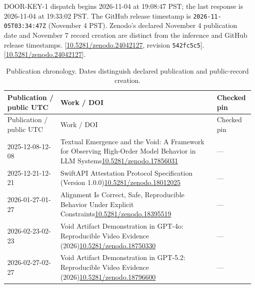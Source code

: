 \documentclass[11pt,letterpaper]{article}
\begin{document}
DOOR-KEY-1 dispatch begins 2026-11-04 at 19:08:47 PST; the last response is 2026-11-04 at 19:33:02 PST. The GitHub release timestamp is \texttt{2026-11-05T03:34:47Z} (November 4 PST). Zenodo’s declared November 4 publication date and November 7 record creation are distinct from the inference and GitHub release timestamps. [\href{https://doi.org/10.5281/zenodo.24042127}{10.5281/zenodo.24042127}, revision \texttt{542fc5c5}]. [\href{https://doi.org/10.5281/zenodo.24042127}{10.5281/zenodo.24042127}].

{\small
\begin{longtable}{p{1.25in}p{4.1in}l}
\caption{Publication chronology. Dates distinguish declared publication and public-record creation.}\label{tab:evidence-25}\\
\toprule
Publication / public UTC & Work / DOI & Checked pin \\ \midrule
\endfirsthead
\toprule
Publication / public UTC & Work / DOI & Checked pin \\ \midrule
\endhead
2025-12-08\newline 2025-12-08 & Textual Emergence and the Void: A Framework for Observing High-Order Model Behavior in LLM Systems\newline \href{https://doi.org/10.5281/zenodo.17856031}{10.5281/zenodo.17856031} & --- \\
2025-12-21\newline 2025-12-21 & SwiftAPI Attestation Protocol Specification (Version 1.0.0)\newline \href{https://doi.org/10.5281/zenodo.18012025}{10.5281/zenodo.18012025} & --- \\
2026-01-27\newline 2026-01-27 & Alignment Is Correct, Safe, Reproducible Behavior Under Explicit Constraints\newline \href{https://doi.org/10.5281/zenodo.18395519}{10.5281/zenodo.18395519} & --- \\
2026-02-23\newline 2026-02-23 & Void Artifact Demonstration in GPT-4o: Reproducible Video Evidence (2026)\newline \href{https://doi.org/10.5281/zenodo.18750330}{10.5281/zenodo.18750330} & --- \\
2026-02-27\newline 2026-02-27 & Void Artifact Demonstration in GPT-5.2: Reproducible Video Evidence (2026)\newline \href{https://doi.org/10.5281/zenodo.18796600}{10.5281/zenodo.18796600} & --- \\

\end{longtable}}
\end{document}
